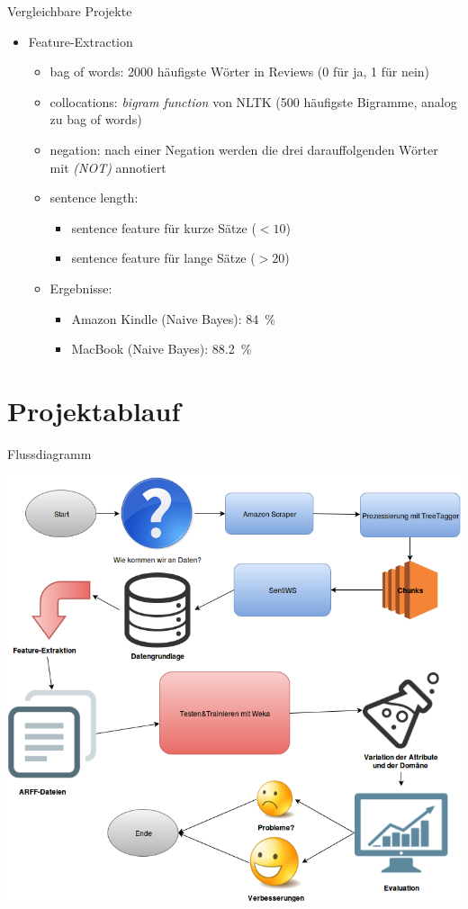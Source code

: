 \documentclass[note=hide]{beamer} %
\begin{document}
\begin{frame}{Vergleichbare Projekte}
	\begin{itemize}
		\item Feature-Extraction
		\begin{itemize}
			\item bag of words: 2000 häufigste Wörter in Reviews (0 für ja, 1 für nein)
			\item collocations: \emph{bigram function} von NLTK (500 häufigste Bigramme, analog zu bag of words)
			\item negation: nach einer Negation werden die drei darauffolgenden Wörter mit \emph{(NOT)} annotiert
			\item sentence length: 
			\begin{itemize}
				\item sentence feature für kurze Sätze ($<10$)
				\item sentence feature für lange Sätze ($>20$)
			\end{itemize}
			\item Ergebnisse:
			\begin{itemize}
				\item Amazon Kindle (Naive Bayes): \SI{84}{\%}
				\item MacBook (Naive Bayes): \SI{88.2}{\%}
			\end{itemize}
			
		\end{itemize}
		
	\end{itemize}
\end{frame}

\section{Projektablauf}

\begin{frame}{Flussdiagramm}
	\begin{center}
	\includegraphics[scale=0.287]{flussdiagramm.png}
	\end{center}
\end{frame}
\end{document}
